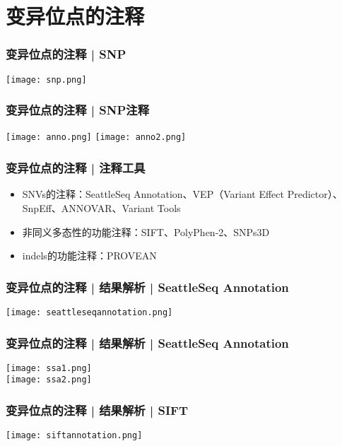 \section{变异位点的注释}
\begin{frame}
  \frametitle{变异位点的注释 | SNP}
    \begin{center}
      \texttt{[image: snp.png]}
    \end{center}
\end{frame}

\begin{frame}
  \frametitle{变异位点的注释 | \alert{SNP注释}}
    \begin{center}
      \texttt{[image: anno.png]}
      \vspace{0.5cm}
      \texttt{[image: anno2.png]}
    \end{center}
\end{frame}

\begin{frame}
  \frametitle{变异位点的注释 | 注释工具}
  \begin{itemize}
    \item SNVs的注释：SeattleSeq Annotation、VEP（Variant Effect Predictor）、SnpEff、ANNOVAR、Variant Tools
    \item 非同义多态性的功能注释：SIFT、PolyPhen-2、SNPs3D
    \item indels的功能注释：PROVEAN
  \end{itemize}
\end{frame}

\begin{frame}
  \frametitle{变异位点的注释 | \alert{结果解析} | SeattleSeq Annotation}
    \begin{center}
      \texttt{[image: seattleseqannotation.png]}
    \end{center}
\end{frame}

\begin{frame}
  \frametitle{变异位点的注释 | \alert{结果解析} | SeattleSeq Annotation}
    \begin{center}
      \texttt{[image: ssa1.png]}\\
      \vspace*{0.6cm}
      \texttt{[image: ssa2.png]}
    \end{center}
\end{frame}

\begin{frame}
  \frametitle{变异位点的注释 | \alert{结果解析} | SIFT}
    \begin{center}
      \texttt{[image: siftannotation.png]}
    \end{center}
\end{frame}

